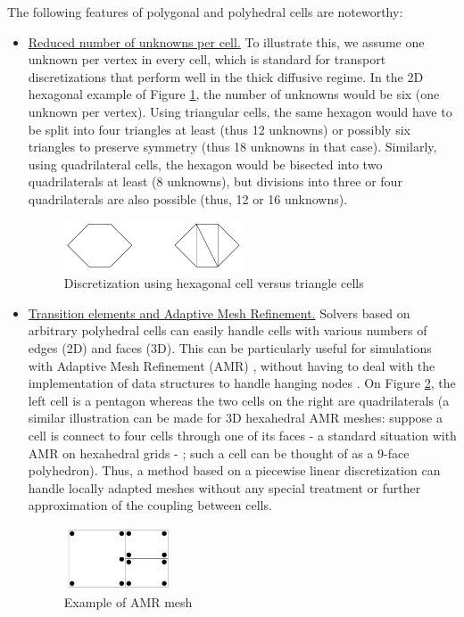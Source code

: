 The following features of polygonal and polyhedral cells are noteworthy:
\begin{itemize}
 \item \underline{Reduced number of unknowns per cell.} To illustrate this, we
   assume one unknown per vertex in every cell, which is standard for
   transport discretizations that perform well in the thick diffusive regime.
   In the 2D hexagonal example of Figure \ref{fig_hexa_split}, the number of
   unknowns would be six (one unknown per vertex). Using triangular cells, the
   same hexagon would have to be split into four triangles at least (thus 12
   unknowns) or possibly six triangles to preserve symmetry (thus 18 unknowns in
   that case). Similarly, using quadrilateral cells, the hexagon would be
   bisected into two quadrilaterals at least (8 unknowns), but divisions into
   three or four quadrilaterals are also possible (thus, 12 or 16 unknowns).
   \begin{figure}[H]
   \centering
   \includegraphics[width=0.5\textwidth]{./Dsa/hex_tri_cells}
   \caption{Discretization using hexagonal cell versus triangle cells}
   \label{fig_hexa_split}
   \end{figure}
 \item \underline{Transition elements and Adaptive Mesh Refinement.} Solvers
   based on arbitrary polyhedral cells can easily handle cells with various
   numbers of edges (2D) and faces (3D). This can be particularly useful for
   simulations with Adaptive Mesh Refinement (AMR)
   \cite{amr_block,amr_rad,amr_unstruc}, without having to deal with the
   implementation of data structures to handle hanging nodes
   \cite{locally_hanging_nodes,arbitrary_hanging_nodes,dealII_hanging_nodes}.
   On Figure \ref{fig_amr}, the left cell is a pentagon whereas the two cells 
   on the right
   are quadrilaterals (a similar illustration can be made for 3D hexahedral
   AMR meshes: suppose a cell is connect to four cells through one of its faces
   - a standard situation with AMR on hexahedral grids - ; such a cell can be
   thought of as a 9-face polyhedron). Thus, a method based on a piecewise linear
   discretization can handle locally adapted meshes without any special
   treatment or further approximation of the coupling between cells.
   \begin{figure}[H]
   \centering
   \includegraphics[width=0.3\textwidth]{./Dsa/amr}
   \caption{Example of AMR mesh}
   \label{fig_amr}
   \end{figure}
\end{itemize}
